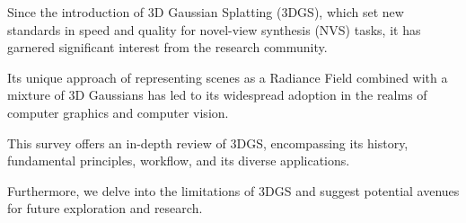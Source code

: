 Since the introduction of 3D Gaussian Splatting (3DGS), 
which set new standards in speed and quality for novel-view synthesis (NVS) tasks, it has garnered significant interest from the research community. 

Its unique approach of representing scenes as a Radiance Field combined with a mixture of 3D Gaussians has led to its widespread adoption in the realms of computer graphics and computer vision. 

This survey offers an in-depth review of 3DGS, encompassing its history, fundamental principles, workflow, and its diverse applications. 

Furthermore, we delve into the limitations of 3DGS and suggest potential avenues for future exploration and research.